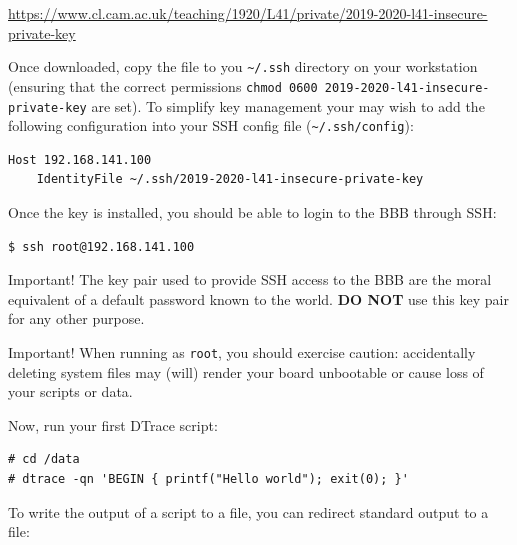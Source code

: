 \documentclass[a4paper,10pt]{article}
\newcommand{\code}[1]{\texttt{\small #1}}
\begin{document}
\smallskip
\noindent
{\small
\url{https://www.cl.cam.ac.uk/teaching/1920/L41/private/2019-2020-l41-insecure-private-key}
}
\smallskip

Once downloaded, copy the file to you \code{\textasciitilde/.ssh} directory on
your workstation (ensuring that the correct permissions \code{chmod 0600
2019-2020-l41-insecure-private-key} are set).  To simplify key management your
may wish to add the following configuration into your SSH config file
(\code{\textasciitilde/.ssh/config}):

\begin{small}
\begin{verbatim}
Host 192.168.141.100
    IdentityFile ~/.ssh/2019-2020-l41-insecure-private-key
\end{verbatim}
\end{small}

Once the key is installed, you should be able to login to the BBB through SSH:

\begin{small}
\begin{verbatim}
$ ssh root@192.168.141.100
\end{verbatim}
\end{small}

\begin{bclogo}[logo=\bcattention, noborder=true, barre=none]{Important!}
    The key pair used to provide SSH access to the BBB are the moral
    equivalent of a default password known to the world.  \textbf{DO NOT} use
    this key pair for any other purpose.
\end{bclogo}


\begin{bclogo}[logo=\bcattention, noborder=true, barre=none]{Important!}
    When running as \code{root}, you should exercise caution: accidentally
    deleting system files may (will) render your board unbootable or cause loss
    of your scripts or data.
\end{bclogo}

Now, run your first DTrace script:

\begin{small}
\begin{verbatim}
# cd /data
# dtrace -qn 'BEGIN { printf("Hello world"); exit(0); }'
\end{verbatim}
\end{small}

To write the output of a script to a file, you can redirect standard output to
a file:
\end{document}
